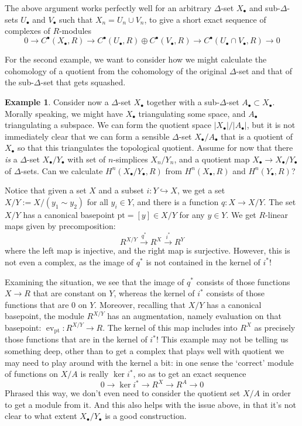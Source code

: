 \documentclass{tufte-handout}
\def\pt {\mathrm{pt}}
\DeclareMathOperator{\ev}{ev}
\theoremstyle{definition}
\newtheorem{example}{Example}
\begin{document}
The above argument works perfectly well for an arbitrary $\Delta$-set $X_\bullet$ and 
sub-$\Delta$-sets $U_\bullet$ and $V_\bullet$ such that $X_n = U_n \cup V_n$, to give a short
exact sequence of complexes of $R$-modules
\[
0\to C^\bullet(X_\bullet,R) \to C^\bullet(U_\bullet,R) \oplus C^\bullet(V_\bullet,R) \to C^\bullet(U_\bullet\cap V_\bullet,R) \to 0
\]

For the second example, we want to consider how we might calculate the cohomology of a quotient
from the cohomology of the original $\Delta$-set and that of the sub-$\Delta$-set that gets squashed.

\begin{example}

Consider now a $\Delta$-set $X_\bullet$ together with a sub-$\Delta$-set $A_\bullet 
\subset X_\bullet$. Morally 
speaking, we might have $X_\bullet$ triangulating some space, and $A_\bullet$ 
triangulating a subspace. We can form the quotient space $|X_\bullet|/|A_\bullet|$, but 
it is not immediately clear that we can form a sensible $\Delta$-set 
$X_\bullet/A_\bullet$ that is a quotient of $X_\bullet$ so that this triangulates the 
topological quotient. Assume for now that there \emph{is} a $\Delta$-set 
$X_\bullet/Y_\bullet$ with set of $n$-simplices $X_n/Y_n$, and a quotient map 
$X_\bullet\to X_\bullet/Y_\bullet$ of $\Delta$-sets. Can we calculate 
$H^n(X_\bullet/Y_\bullet,R)$ from $H^n(X_\bullet,R)$ and $H^n(Y_\bullet,R)$?

Notice that given a set $X$ and a subset $i\colon Y\hookrightarrow X$, we get a set $X/Y := X/(y_1\sim y_2)$ for all $y_i\in Y$,
and there is a function $q\colon X\to X/Y$. The set $X/Y$ has a canonical basepoint $\pt = [y]\in X/Y$ for any $y\in Y$.
We get $R$-linear maps given by precomposition:
\[
	R^{X/Y} \xrightarrow{q^*} R^X \xrightarrow{i^*} R^Y 
\]
where the left map is injective, and the right map is surjective. However, this is not even a complex,
as the image of $q^*$ is not contained in the kernel of $i^*$!

Examining the situation, we see that the image of $q^*$ consists of those functions $X\to R$
that are constant on $Y$, whereas the kernel of $i^*$ consists of those functions that are
$0$ on $Y$. Moreover, recalling that $X/Y$ has a canonical basepoint, the module $R^{X/Y}$ 
has an augmentation, namely evaluation on that basepoint: $\ev_\pt\colon R^{X/Y}\to R$. The 
kernel of this map includes into $R^X$ as precisely those functions that are in the kernel
of $i^*$! This example may not be telling us something deep, other than to get a complex that
plays well with quotient we may need to play around with the kernel a bit: in one sense the 
`correct' module of functions on $X/A$ is really $\ker i^*$, so as to get an exact sequence
\[
	0\to \ker i^* \to R^X \to R^A\to 0
\] 
Phrased this way, we don't even need to consider the quotient set $X/A$ in order to get a module
from it. And this also helps with the issue above, in that it's not clear to what extent 
$X_\bullet/Y_\bullet$ is a good construction. 


\end{example}
\end{document}
